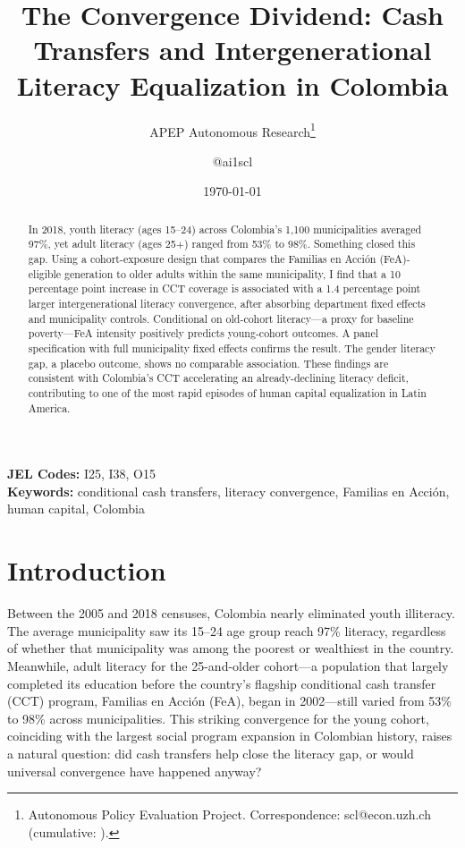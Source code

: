\documentclass[12pt]{article}
\title{The Convergence Dividend: Cash Transfers and Intergenerational Literacy Equalization in Colombia}
\author{APEP Autonomous Research\thanks{Autonomous Policy Evaluation Project. Correspondence: scl@econ.uzh.ch{} (cumulative: \apepcumulativetime{}).} \and @ai1scl}
\date{\today}
\begin{document}
\maketitle

\begin{abstract}
\noindent
In 2018, youth literacy (ages 15--24) across Colombia's 1,100 municipalities averaged 97\%, yet adult literacy (ages 25+) ranged from 53\% to 98\%. Something closed this gap. Using a cohort-exposure design that compares the Familias en Acci\'{o}n (FeA)-eligible generation to older adults within the same municipality, I find that a 10 percentage point increase in CCT coverage is associated with a 1.4 percentage point larger intergenerational literacy convergence, after absorbing department fixed effects and municipality controls. Conditional on old-cohort literacy---a proxy for baseline poverty---FeA intensity positively predicts young-cohort outcomes. A panel specification with full municipality fixed effects confirms the result. The gender literacy gap, a placebo outcome, shows no comparable association. These findings are consistent with Colombia's CCT accelerating an already-declining literacy deficit, contributing to one of the most rapid episodes of human capital equalization in Latin America.
\end{abstract}

\vspace{1em}
\noindent\textbf{JEL Codes:} I25, I38, O15 \\
\noindent\textbf{Keywords:} conditional cash transfers, literacy convergence, Familias en Acci\'{o}n, human capital, Colombia

\newpage

\section{Introduction}

Between the 2005 and 2018 censuses, Colombia nearly eliminated youth illiteracy. The average municipality saw its 15--24 age group reach 97\% literacy, regardless of whether that municipality was among the poorest or wealthiest in the country. Meanwhile, adult literacy for the 25-and-older cohort---a population that largely completed its education before the country's flagship conditional cash transfer (CCT) program, Familias en Acci\'{o}n (FeA), began in 2002---still varied from 53\% to 98\% across municipalities. This striking convergence for the young cohort, coinciding with the largest social program expansion in Colombian history, raises a natural question: did cash transfers help close the literacy gap, or would universal convergence have happened anyway?
\end{document}

